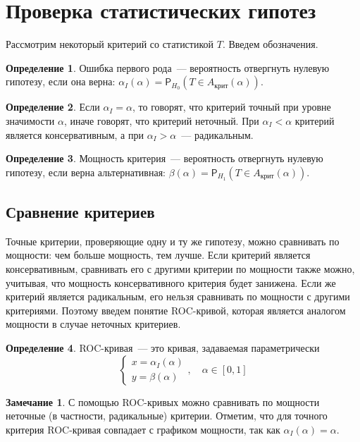 \documentclass[specialist,
substylefile = spbu_report.rtx,
subf,href,colorlinks=true, 12pt]{disser}
\theoremstyle{definition}
\newtheorem{definition}{Определение}[section]
\newtheorem{remark}{Замечание}[section]
\begin{document}
\section{Проверка статистических гипотез}
Рассмотрим некоторый критерий со статистикой $T$. Введем обозначения.
\begin{definition}
	Ошибка первого рода~--- вероятность отвергнуть нулевую гипотезу, если она верна: $\alpha_I(\alpha)=\mathsf P_{H_0}(T\in A_\text{крит}(\alpha))$.
\end{definition}
\begin{definition}
	Если $\alpha_I=\alpha$, то говорят, что критерий точный при уровне значимости $\alpha$, иначе говорят, что критерий неточный. При $\alpha_I<\alpha$ критерий является консервативным, а при $\alpha_I>\alpha$~--- радикальным.
\end{definition}
\begin{definition}
	Мощность критерия~--- вероятность отвергнуть нулевую гипотезу, если верна альтернативная: $\beta(\alpha)=\mathsf P_{H_1}(T\in A_\text{крит}(\alpha))$.
\end{definition}
\subsection{Сравнение критериев}
Точные критерии, проверяющие одну и ту же гипотезу, можно сравнивать по мощности: чем больше мощность, тем лучше. Если критерий является консервативным, сравнивать его с другими критерии по мощности также можно, учитывая, что мощность консервативного критерия будет занижена. Если же критерий является радикальным, его нельзя сравнивать по мощности с другими критериями. Поэтому введем понятие ROC-кривой, которая является аналогом мощности в случае неточных критериев.
\begin{definition}
	ROC-кривая~--- это кривая, задаваемая параметрически
	\[
		\begin{cases}
			x=\alpha_I(\alpha) \\
			y=\beta(\alpha)
		\end{cases},\quad \alpha\in[0,1]
	\]
\end{definition}
\begin{remark}
	С помощью ROC-кривых можно сравнивать по мощности неточные (в частности, радикальные) критерии. Отметим, что для точного критерия ROC-кривая совпадает с графиком мощности, так как $\alpha_I(\alpha)=\alpha$.
\end{remark}
\end{document}

